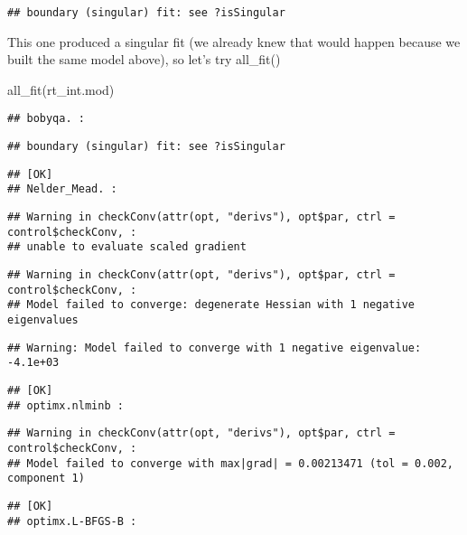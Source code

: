 \documentclass[
]{article}
\newenvironment{Shaded}{\begin{snugshade}}{\end{snugshade}}
\newcommand{\FunctionTok}[1]{\textcolor[rgb]{0.00,0.00,0.00}{#1}}
\newcommand{\NormalTok}[1]{#1}
\begin{document}
\begin{verbatim}
## boundary (singular) fit: see ?isSingular
\end{verbatim}

This one produced a singular fit (we already knew that would happen
because we built the same model above), so let's try all\_fit()

\begin{Shaded}
\begin{Highlighting}[]
\FunctionTok{all\_fit}\NormalTok{(rt\_int.mod)}
\end{Highlighting}
\end{Shaded}

\begin{verbatim}
## bobyqa. :
\end{verbatim}

\begin{verbatim}
## boundary (singular) fit: see ?isSingular
\end{verbatim}

\begin{verbatim}
## [OK]
## Nelder_Mead. :
\end{verbatim}

\begin{verbatim}
## Warning in checkConv(attr(opt, "derivs"), opt$par, ctrl = control$checkConv, :
## unable to evaluate scaled gradient
\end{verbatim}

\begin{verbatim}
## Warning in checkConv(attr(opt, "derivs"), opt$par, ctrl = control$checkConv, :
## Model failed to converge: degenerate Hessian with 1 negative eigenvalues
\end{verbatim}

\begin{verbatim}
## Warning: Model failed to converge with 1 negative eigenvalue: -4.1e+03
\end{verbatim}

\begin{verbatim}
## [OK]
## optimx.nlminb :
\end{verbatim}

\begin{verbatim}
## Warning in checkConv(attr(opt, "derivs"), opt$par, ctrl = control$checkConv, :
## Model failed to converge with max|grad| = 0.00213471 (tol = 0.002, component 1)
\end{verbatim}

\begin{verbatim}
## [OK]
## optimx.L-BFGS-B :
\end{verbatim}
\end{document}
